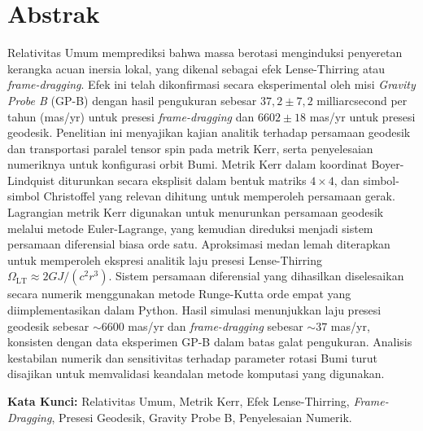 
\chapter*{Abstrak}

Relativitas Umum memprediksi bahwa massa berotasi menginduksi penyeretan kerangka acuan inersia lokal, yang dikenal sebagai efek Lense-Thirring atau \textit{frame-dragging}.
Efek ini telah dikonfirmasi secara eksperimental oleh misi \textit{Gravity Probe B} (GP-B) dengan hasil pengukuran sebesar $37{,}2 \pm 7{,}2$ milliarcsecond per tahun (mas/yr) untuk presesi \textit{frame-dragging} dan $6602 \pm 18$ mas/yr untuk presesi geodesik.
Penelitian ini menyajikan kajian analitik terhadap persamaan geodesik dan transportasi paralel tensor spin pada metrik Kerr, serta penyelesaian numeriknya untuk konfigurasi orbit Bumi.
Metrik Kerr dalam koordinat Boyer-Lindquist diturunkan secara eksplisit dalam bentuk matriks $4 \times 4$, dan simbol-simbol Christoffel yang relevan dihitung untuk memperoleh persamaan gerak.
Lagrangian metrik Kerr digunakan untuk menurunkan persamaan geodesik melalui metode Euler-Lagrange, yang kemudian direduksi menjadi sistem persamaan diferensial biasa orde satu.
Aproksimasi medan lemah diterapkan untuk memperoleh ekspresi analitik laju presesi Lense-Thirring $\Omega_{\text{LT}} \approx 2GJ/(c^2 r^3)$.
Sistem persamaan diferensial yang dihasilkan diselesaikan secara numerik menggunakan metode Runge-Kutta orde empat yang diimplementasikan dalam Python.
Hasil simulasi menunjukkan laju presesi geodesik sebesar $\sim\!6600$ mas/yr dan \textit{frame-dragging} sebesar $\sim\!37$ mas/yr, konsisten dengan data eksperimen GP-B dalam batas galat pengukuran.
Analisis kestabilan numerik dan sensitivitas terhadap parameter rotasi Bumi turut disajikan untuk memvalidasi keandalan metode komputasi yang digunakan.

\vspace{1em}
\noindent\textbf{Kata Kunci:} Relativitas Umum, Metrik Kerr, Efek Lense-Thirring, \textit{Frame-Dragging}, Presesi Geodesik, Gravity Probe B, Penyelesaian Numerik.
